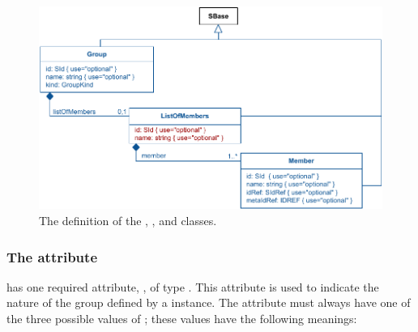 \begin{figure}[bh]
  \includegraphics{figs/group-uml-v1}
 \caption{The definition of the \Group, \ListOfMembers, and \Member classes.}
  \label{group-uml}
  \label{member-uml}
\end{figure}

\subsubsection{The \fixttspace{} attribute}
\label{kind-attribute}

\Group has one required attribute, , of type .  This attribute is used to indicate the nature of the group defined by a \Group instance.  The  attribute must always have one of the three possible values of ; these values have the following meanings:

